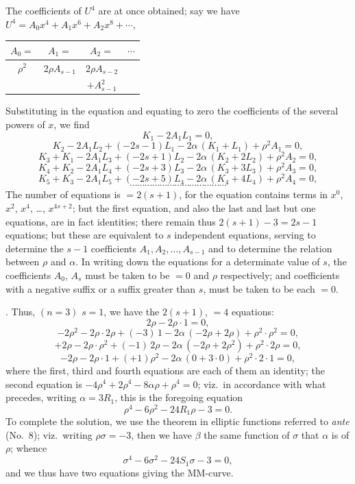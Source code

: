 \documentclass[11pt]{article}
\begin{document}
\medskip

\noindent The coefficients of $U^4$ are at once obtained; say we have $U^4 = A_0 x^4 + A_1 x^6 + A_2 x^8 + \cdots$,

\medskip

\begin{center}
\begin{tabular}{|c|c|c|c|}
\hline
$A_0 =$ & $A_1 =$ & $A_2 =$ & $\cdots$ \\
\hline
$\rho^2$ & $2\rho A_{s-1}$ & $2\rho A_{s-2}$ & \\
 & & $+ A_{s-1}^2$ & \\
\hline
\end{tabular}
\end{center}

\newpage

\noindent Substituting in the equation and equating to zero the coefficients of the several powers of $x$, we find
\[
K_1 - 2 A_1 L_1 = 0,
\]
\[
K_2 - 2 A_1 L_2 + (-2s - 1)L_1 - 2\alpha\,(K_1 + L_1) + \rho^2 A_1 = 0,
\]
\[
K_3 + K_1 - 2 A_1 L_3 + (-2s + 1)L_2 - 2\alpha\,(K_2 + 2 L_2) + \rho^2 A_2 = 0,
\]
\[
K_4 + K_2 - 2 A_1 L_4 + (-2s + 3)L_3 - 2\alpha\,(K_3 + 3 L_3) + \rho^2 A_3 = 0,
\]
\[
K_5 + K_3 - 2 A_1 L_5 + (-2s + 5)L_4 - 2\alpha\,(K_4 + 4 L_4) + \rho^2 A_4 = 0,
\]
\[
\cdots\cdots\cdots\cdots\cdots\cdots\cdots\cdots\cdots\cdots\cdots\cdots\cdots
\]
The number of equations is $= 2(s+1)$, for the equation contains terms in $x^0$, $x^2$, $x^4$, \ldots, $x^{4s+2}$; but the first equation, and also the last and last but one equations, are in fact identities; there remain thus $2(s+1) - 3 = 2s - 1$ equations; but these are equivalent to $s$ independent equations, serving to determine the $s - 1$ coefficients $A_1, A_2, \ldots, A_{s-1}$ and to determine the relation between $\rho$ and $\alpha$. In writing down the equations for a determinate value of $s$, the coefficients $A_0$, $A_s$ must be taken to be $= 0$ and $\rho$ respectively; and coefficients with a negative suffix or a suffix greater than $s$, must be taken to be each $= 0$.

\medskip

. Thus, $(n = 3)$ $s = 1$, we have the $2(s+1)$, $= 4$ equations:
\[
2\rho - 2\rho\cdot 1 = 0,
\]
\[
-2\rho^2 - 2\rho\cdot 2\rho + (-3)\,1 - 2\alpha\,(-2\rho + 2\rho) + \rho^2\cdot\rho^2 = 0,
\]
\[
+2\rho - 2\rho\cdot\rho^2 + (-1)\,2\rho - 2\alpha\,(-2\rho + 2\rho^2) + \rho^2\cdot 2\rho = 0,
\]
\[
-2\rho - 2\rho\cdot 1 + (+1)\rho^2 - 2\alpha\,(0 + 3\cdot 0) + \rho^2\cdot 2\cdot 1 = 0,
\]
where the first, third and fourth equations are each of them an identity; the second equation is $-4\rho^4 + 2\rho^4 - 8\alpha\rho + \rho^4 = 0$; viz.\ in accordance with what precedes, writing $\alpha = 3 R_1$, this is the foregoing equation
\[
\rho^4 - 6\rho^2 - 24 R_1\rho - 3 = 0.
\]
To complete the solution, we use the theorem in elliptic functions referred to \textit{ante} (No.~8); viz.\ writing $\rho\sigma = -3$, then we have $\beta$ the same function of $\sigma$ that $\alpha$ is of $\rho$; whence
\[
\sigma^4 - 6\sigma^2 - 24 S_1\sigma - 3 = 0,
\]
and we thus have two equations giving the MM-curve.
\end{document}
